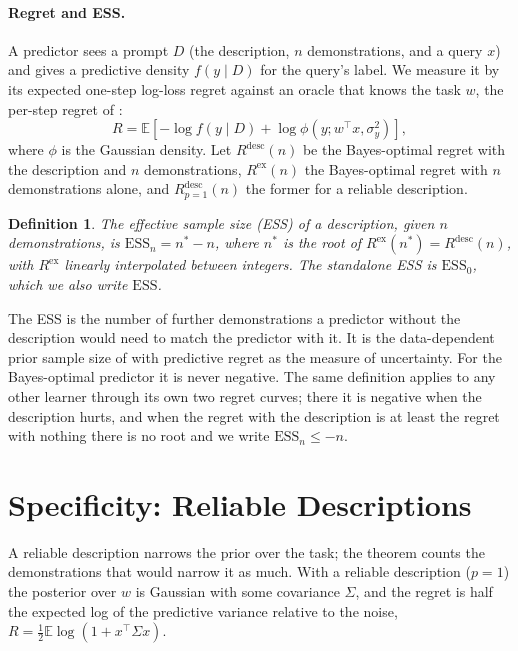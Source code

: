 \documentclass{article}
\newtheorem{definition}{Definition}
\newcommand{\ess}{\mathrm{ESS}}
\newcommand{\E}{\mathbb{E}}
\begin{document}
\paragraph{Regret and ESS.} A predictor sees a prompt $D$ (the description, $n$ demonstrations, and a query $x$) and gives a predictive density $f(y \mid D)$ for the query's label. We measure it by its expected one-step log-loss regret against an oracle that knows the task $w$, the per-step regret of \citet{genewein2025}:
\begin{equation}\label{eq:regret}
    R = \E \left[ -\log f(y \mid D) + \log \phi(y; w^\top x, \sigma_y^2) \right],
\end{equation}
where $\phi$ is the Gaussian density. Let $R^{\mathrm{desc}}(n)$ be the Bayes-optimal regret with the description and $n$ demonstrations, $R^{\mathrm{ex}}(n)$ the Bayes-optimal regret with $n$ demonstrations alone, and $R^{\mathrm{desc}}_{p=1}(n)$ the former for a reliable description.
\begin{definition}\label{def:ess}
The effective sample size (ESS) of a description, given $n$ demonstrations, is $\ess_n = n^* - n$, where $n^*$ is the root of $R^{\mathrm{ex}}(n^*) = R^{\mathrm{desc}}(n)$, with $R^{\mathrm{ex}}$ linearly interpolated between integers. The standalone ESS is $\ess_0$, which we also write $\ess$.
\end{definition}
The ESS is the number of further demonstrations a predictor without the description would need to match the predictor with it. It is the data-dependent prior sample size of \citet{reimherr2021} with predictive regret as the measure of uncertainty. For the Bayes-optimal predictor it is never negative. The same definition applies to any other learner through its own two regret curves; there it is negative when the description hurts, and when the regret with the description is at least the regret with nothing there is no root and we write $\ess_n \le -n$.

\section{Specificity: Reliable Descriptions}\label{sec:specificity}
A reliable description narrows the prior over the task; the theorem counts the demonstrations that would narrow it as much. With a reliable description ($p = 1$) the posterior over $w$ is Gaussian with some covariance $\Sigma$, and the regret is half the expected log of the predictive variance relative to the noise, $R = \tfrac12 \E \log(1 + x^\top \Sigma x)$.
\end{document}
